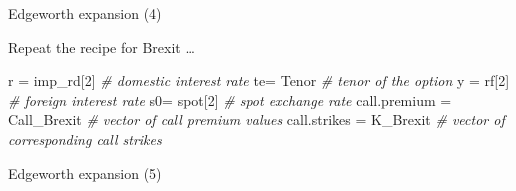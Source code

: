 \documentclass[ignorenonframetext,aspectratio=169]{beamer}
\newenvironment{Shaded}{}{}
\newcommand{\KeywordTok}[1]{\textcolor[rgb]{0.00,0.44,0.13}{\textbf{#1}}}
\newcommand{\DataTypeTok}[1]{\textcolor[rgb]{0.56,0.13,0.00}{#1}}
\newcommand{\DecValTok}[1]{\textcolor[rgb]{0.25,0.63,0.44}{#1}}
\newcommand{\StringTok}[1]{\textcolor[rgb]{0.25,0.44,0.63}{#1}}
\newcommand{\CommentTok}[1]{\textcolor[rgb]{0.38,0.63,0.69}{\textit{#1}}}
\newcommand{\OtherTok}[1]{\textcolor[rgb]{0.00,0.44,0.13}{#1}}
\newcommand{\OperatorTok}[1]{\textcolor[rgb]{0.40,0.40,0.40}{#1}}
\newcommand{\NormalTok}[1]{#1}
\begin{document}
\begin{frame}[fragile]{Edgeworth expansion (4)}

Repeat the recipe for Brexit \ldots{}

\begin{Shaded}
\begin{Highlighting}[]
\NormalTok{r =}\StringTok{ }\NormalTok{imp_rd[}\DecValTok{2}\NormalTok{]                      }\CommentTok{# domestic interest rate}
\NormalTok{te=}\StringTok{ }\NormalTok{Tenor                          }\CommentTok{# tenor of the option}
\NormalTok{y =}\StringTok{ }\NormalTok{rf[}\DecValTok{2}\NormalTok{]                          }\CommentTok{# foreign interest rate}
\NormalTok{s0=}\StringTok{ }\NormalTok{spot[}\DecValTok{2}\NormalTok{]                        }\CommentTok{# spot exchange rate}
\NormalTok{call.premium =}\StringTok{ }\NormalTok{Call_Brexit         }\CommentTok{# vector of call premium values}
\NormalTok{call.strikes =}\StringTok{ }\NormalTok{K_Brexit            }\CommentTok{# vector of corresponding call strikes}
\end{Highlighting}
\end{Shaded}

\end{frame}

\begin{frame}[fragile]{Edgeworth expansion (5)}

\begin{Shaded}
\end{Shaded}

\end{frame}
\end{document}
